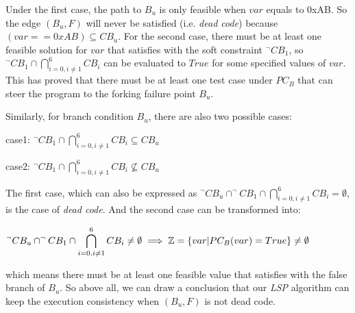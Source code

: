 Under the first case, the path to $B_u$ is only feasible when $var$ equals to 0xAB. So the edge $(B_u, F)$ will never be satisfied (i.e. \emph{dead code}) because $(var == 0xAB) \subseteq CB_u$. For the second case, there must be at least one feasible solution for $var$ that satisfies with the soft constraint $^\neg CB_1$, so $^\neg CB_1 \cap \bigcap_{i=0,i \neq 1}^{6} CB_i$ can be evaluated to $True$ for some specified values of $var$. This has proved that there must be at least one test case under $PC_B$ that can steer the program to the forking failure point $B_u$.

Similarly, for branch condition $B_u$, there are also two possible cases:
\begin{center}
case1: $\displaystyle ^\neg CB_1 \cap \bigcap\limits_{i=0,i\neq 1}^6 CB_i \subseteq CB_u$

case2: $\displaystyle ^\neg CB_1 \cap \bigcap\limits_{i=0,i\neq 1}^6 CB_i \nsubseteq CB_u$
\end{center}

The first case, which can also be expressed as $^\neg CB_u \cap ^\neg CB_1 \cap \bigcap_{i=0,i\neq 1}^6 CB_i = \emptyset$, is the case of \emph{dead code}. And the second case can be transformed into:
\begin{center}
$\displaystyle ^\neg CB_u \cap ^\neg CB_1 \cap \bigcap\limits_{i=0,i\neq 1}^6 CB_i \neq \emptyset \implies \mathbb{Z} = \{var\arrowvert PC_B(var) = True\} \neq \emptyset$
\end{center}

\noindent which means there must be at least one feasible value that satisfies with the false branch of $B_u$. So above all, we can draw a conclusion that our \emph{LSP} algorithm can keep the execution consistency when $(B_u, F)$ is not dead code.